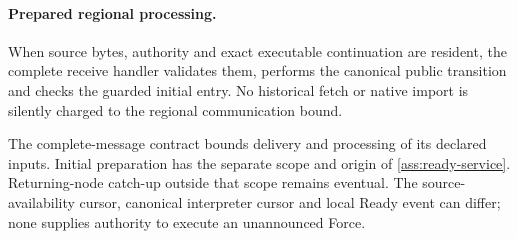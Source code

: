 \paragraph{Prepared regional processing.}
\label{sec:source-step-timing}
When source bytes, authority and exact executable continuation are
resident, the complete receive handler validates them, performs the
canonical public transition and checks the guarded initial entry.
No historical fetch or native import is silently charged to the
regional communication bound.

The complete-message contract bounds delivery and processing of its
declared inputs. Initial preparation has the separate scope and origin
of \cref{ass:ready-service}. Returning-node catch-up outside that scope
remains eventual. The source-availability cursor, canonical interpreter
cursor and local Ready event can differ; none supplies authority to
execute an unannounced Force.
